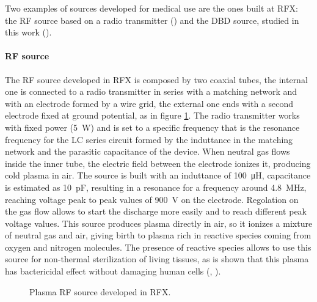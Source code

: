 Two examples of sources developed for medical use are the ones built at RFX: the RF source based on a radio transmitter (\cite{Martines_2009}) and the DBD source, studied in this work (\cite{DeMasi_2018}).

\paragraph{RF source}
The RF source developed in RFX is composed by two coaxial tubes, the internal one is connected to a radio transmitter in series with a matching network and with an electrode formed by a wire grid, the external one ends with a second electrode fixed at ground potential, as in figure \ref{fig:RF}. The radio transmitter works with fixed power (\SI{5}{\watt}) and is set to a specific frequency that is the resonance frequency for the LC series circuit formed by the induttance in the matching network and the parasitic capacitance of the device. When neutral gas flows inside the inner tube, the electric field between the electrode ionizes it, producing cold plasma in air. The source is built with an induttance of \SI{100}{\micro\henry}, capacitance is estimated as \SI{10}{\pico\farad}, resulting in a resonance for a frequency around \SI{4.8}{\mega\hertz}, reaching voltage peak to peak values of \SI{900}{\volt} on the electrode. Regolation on the gas flow allows to start the discharge more easily and to reach different peak voltage values.
This source produces plasma directly in air, so it ionizes a mixture of neutral gas and air, giving birth to plasma rich in reactive species coming from oxygen and nitrogen molecules. The presence of reactive species allows to use this source for non-thermal sterilization of living tissues, as is shown that this plasma has bactericidal effect without damaging human cells (\cite{doi:10.1002/ppap.200700154}, \cite{Stoffels_2007}).
\begin{figure}
 \centering
 \hfill
 \caption{Plasma RF source developed in RFX.}
 \label{fig:RF}
\end{figure}


